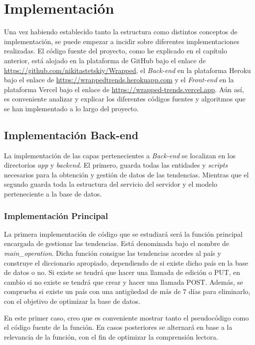 \chapter{Implementación}\label{ch:implmentacion}
Una vez habiendo establecido tanto la estructura como distintos conceptos de implementación, se puede empezar a incidir sobre diferentes implementaciones realizadas. El código fuente del proyecto, como he explicado en el capítulo anterior, está alojado en la plataforma de GitHub bajo el enlace de \url{https://github.com/nikitastetskiy/Wrapped}, el \textit{Back-end} en la plataforma Heroku bajo el enlace de \url{https://wrappedtrends.herokuapp.com} y el \textit{Front-end} en la plataforma Vercel bajo el enlace de \url{https://wrapped-trends.vercel.app}. Aún así, es conveniente analizar y explicar los diferentes códigos fuentes y algoritmos que se han implementado a lo largo del proyecto.

\section{Implementación Back-end}
La implementación de las capas pertenecientes a \textit{Back-end} se localizan en los directorios \textit{app} y \textit{backend}. El primero, guarda todas las entidades y \textit{scripts} necesarios para la obtención y gestión de datos de las tendencias. Mientras que el segundo guarda toda la estructura del servicio del servidor y el modelo perteneciente a la base de datos.

\subsection{Implementación Principal}
La primera implementación de código que se estudiará será la función principal encargada de gestionar las tendencias. Está denominada bajo el nombre de \textit{main\_operation}. Dicha función consigue las tendencias acordes al país y construye el diccionario apropiado, dependiendo de si existe dicho país en la base de datos o no. Si existe se tendrá que hacer una llamada de edición o PUT, en cambio si no existe se tendrá que crear y hacer una llamada POST. Además, se comprueba si existe un país con una antigüedad de más de 7 días para eliminarlo, con el objetivo de optimizar la base de datos.

\vspace{0.3cm}

En este primer caso, creo que es conveniente mostrar tanto el pseudocódigo como el código fuente de la función. En casos posteriores se alternará en base a la relevancia de la función, con el fin de optimizar la comprensión lectora.

